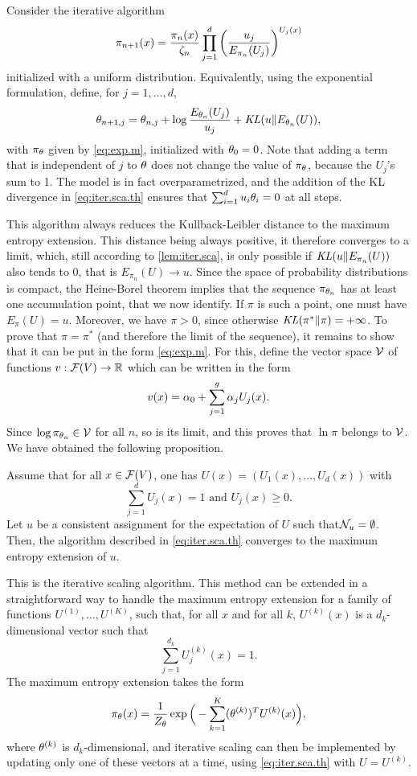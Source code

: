 Consider the iterative algorithm
\[
\pi_{n+1}(x) = \frac{\pi_n(x)}{\zeta_n} \prod_{j=1}^d \left(\frac{u_j}{E_{\pi_n}(
    U_j)}\right)^{U_j(x)}
\]
initialized with a uniform
distribution. Equivalently, using the exponential formulation, define,
for $j=1, \ldots, d$,
\begin{equation}
\label{eq:iter.sca.th}
\theta_{n+1,j} = \theta_{n,j} + \log \frac{E_{\theta_n} (U_j)}{u_j} + \mathit{KL}(u\|E_{\theta_n}(U)),
\end{equation}
with $\pi_\theta$ given by \cref{eq:exp.m}, initialized with  $\theta_0 =
0$.  Note that adding a term that is independent of $j$ to $\theta$
does not change the value of $\pi_\theta$, because the $U_j$'s sum to
1. The model is in fact overparametrized, and the addition of the KL
divergence in \cref{eq:iter.sca.th} ensures that $\sum_{i=1}^d u_i\theta_i
= 0$ at all steps. 

This algorithm always 
reduces the Kullback-Leibler distance to the maximum entropy
extension. This distance  being always positive, it therefore converges to
a limit, which, still according to  \cref{lem:iter.sca}, is only
possible if $\mathit{KL}(u\|E_{\pi_n}(U))$ also tends to 0, that is
$E_{\pi_n}(U) \to u$. Since the
space of probability distributions is compact, the Heine-Borel theorem
implies that the sequence $\pi_{\theta_n}$ has at least one accumulation
point, that we now identify. If $\pi$ is such a point, one must have $E_{\pi}(U) =
u$. Moreover, we have $\pi >0$, since otherwise $\mathit{KL}(\pi^*\|\pi) =
+\infty$. To prove that $\pi = \pi^*$ (and therefore the limit of the
sequence), it remains to show that it can be put in the form
\cref{eq:exp.m}. For this, define the vector space ${\mathcal V}$ of functions $v:
{\mathcal F}(V) \to {\mathbb{R}}$ which can be written in the form
\[
v(x) = \alpha_0 + \sum_{j=1}^g \alpha_j U_j(x).
\]
Since $\log\pi_{\theta_n}\in {\mathcal V}$ for all $n$, so is its limit, and this proves that $\ln \pi$ belongs to
${\mathcal V}$. We have obtained the following proposition.

\begin{proposition}
\label{prop:iter.sca}
Assume that for all $x\in {\mathcal F}(V)$, one has $U(x) =
(U_1(x), \ldots, U_d(x))$ with 
\[
\sum_{j=1}^d U_j(x) = 1 \text{ and } U_j(x) \geq 0.
\]
Let $u$ be a consistent assignment for the expectation of $U$ such
that${\mathcal N}_u = \emptyset$. Then, the algorithm described in  \cref{eq:iter.sca.th} converges
to the maximum entropy extension of $u$.
\end{proposition}

This is the iterative scaling algorithm. This method can be extended
in a straightforward  way to handle the maximum entropy extension for
a family of functions $U^{(1)}, \ldots, U^{(K)}$, such that, for all
$x$ and for all $k$, $U^{(k)}(x)$ is a $d_k$-dimensional vector such
that
\[
\sum_{j=1}^{d_k} U^{(k)}_j(x) = 1.
\]
The maximum entropy extension takes the form
\[
\pi_\theta(x) = \frac1{Z_\theta} \exp\Big(-\sum_{k=1}^K
(\theta^{(k)})^T U^{(k)}(x)\Big),
\]
where $\theta^{(k)}$ is $d_k$-dimensional, and iterative scaling can then
be implemented by updating only one of these vectors at a time, using
\cref{eq:iter.sca.th} with $U = U^{(k)}$. 


